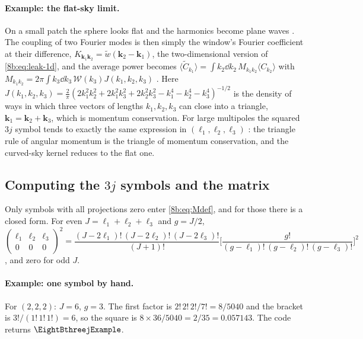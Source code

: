 \paragraph{Example: the flat-sky limit.}
On a small patch the sphere looks flat and the harmonics become plane waves
. The coupling of two Fourier modes is then simply the window's Fourier
coefficient at their difference, $K_{\bm k_1\bm k_2}=\tilde w(\bm k_2-\bm k_1)$, the two-dimensional
version of \eqref{8b:eq:leak-1d}, and the average power becomes
$\langle\widetilde C_{k_1}\rangle=\int k_2\dd k_2\,M_{k_1k_2}\langle C_{k_2}\rangle$ with
$M_{k_1k_2}=2\pi\int k_3\dd k_3\,\mathcal W(k_3)J(k_1,k_2,k_3)$ . Here
$J(k_1,k_2,k_3)=\frac2\pi(2k_1^2k_2^2+2k_1^2k_3^2+2k_2^2k_3^2-k_1^4-k_2^4-k_3^4)^{-1/2}$
 is the density of ways in which three vectors of lengths $k_1,k_2,k_3$ can close
into a triangle, $\bm k_1=\bm k_2+\bm k_3$, which is momentum conservation. For large multipoles the
squared $3j$ symbol tends to exactly the same expression in $(\ell_1,\ell_2,\ell_3)$
: the triangle rule of angular momentum is the triangle of momentum
conservation, and the curved-sky kernel reduces to the flat one.

\subsection{Computing the $3j$ symbols and the matrix}
\label{8b:sec:coupling-code}

Only symbols with all projections zero enter \eqref{8b:eq:Mdef}, and for those there is a
closed form. For even $J=\ell_1+\ell_2+\ell_3$ and $g=J/2$,
\begin{equation}
  \begin{pmatrix}\ell_1&\ell_2&\ell_3\\0&0&0\end{pmatrix}^2
  =\frac{(J-2\ell_1)!\,(J-2\ell_2)!\,(J-2\ell_3)!}{(J+1)!}
   \Biggl[\frac{g!}{(g-\ell_1)!\,(g-\ell_2)!\,(g-\ell_3)!}\Biggr]^2
  \label{8b:eq:3j-closed}
\end{equation}
, and zero for odd $J$.

\paragraph{Example: one symbol by hand.}
For $(2,2,2)$: $J=6$, $g=3$. The first factor is $2!\,2!\,2!/7!=8/5040$ and the bracket is
$3!/(1!\,1!\,1!)=6$, so the square is $8\times36/5040=2/35=0.057143$. The code returns
$\EightBthreejExample$.

